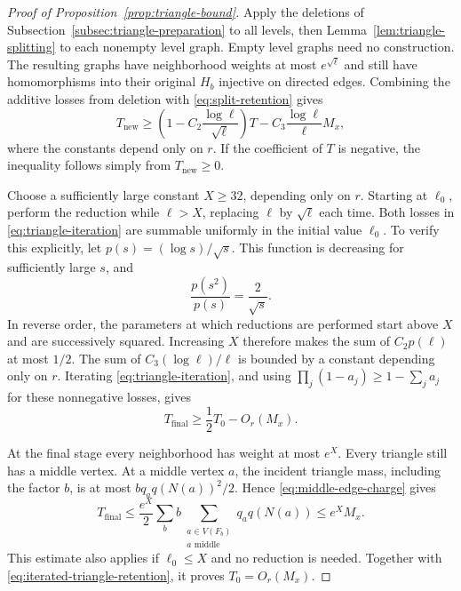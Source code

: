 \begin{proof}[Proof of Proposition~\ref{prop:triangle-bound}]
Apply the deletions of Subsection~\ref{subsec:triangle-preparation} to
all levels, then Lemma~\ref{lem:triangle-splitting} to each nonempty
level graph.  Empty level graphs need no construction.  The resulting
graphs have neighborhood weights at most $e^{\sqrt\ell}$ and still
have homomorphisms into their original $H_b$ injective on directed
edges.  Combining the additive losses from deletion with
\eqref{eq:split-retention} gives
\begin{equation}
 T_{\mathrm{new}}\ge
 \left(1-C_2\frac{\log\ell}{\sqrt\ell}\right)T
       -C_3\frac{\log\ell}{\ell}M_x,
 \label{eq:triangle-iteration}
\end{equation}
where the constants depend only on $r$.  If the coefficient of $T$ is
negative, the inequality follows simply from $T_{\mathrm{new}}\ge0$.

Choose a sufficiently large constant $X\ge32$, depending only on $r$.
Starting at $\ell_0$, perform the reduction while $\ell>X$, replacing
$\ell$ by $\sqrt\ell$ each time.  Both losses in
\eqref{eq:triangle-iteration} are summable uniformly in the initial
value $\ell_0$.  To verify this explicitly, let
$p(s)=(\log s)/\sqrt s$.  This function is decreasing for sufficiently
large $s$, and
\[
 \frac{p(s^2)}{p(s)}=\frac2{\sqrt s}.
\]
In reverse order, the parameters at which reductions are performed
start above $X$ and are successively squared.  Increasing $X$ therefore
makes the sum of $C_2p(\ell)$ at most $1/2$.  The sum of
$C_3(\log\ell)/\ell$ is bounded by a constant depending only on $r$.
Iterating \eqref{eq:triangle-iteration}, and using
$\prod_j(1-a_j)\ge1-\sum_ja_j$ for these nonnegative losses, gives
\begin{equation}
 T_{\mathrm{final}}\ge\frac12T_0-O_r(M_x).
 \label{eq:iterated-triangle-retention}
\end{equation}

At the final stage every neighborhood has weight at most $e^X$.
Every triangle still has a middle vertex.  At a middle vertex $a$,
the incident triangle mass, including the factor $b$, is at most
$bq_aq(N(a))^2/2$.  Hence \eqref{eq:middle-edge-charge} gives
\[
 T_{\mathrm{final}}
 \le\frac{e^X}{2}
      \sum_b b\sum_{\substack{a\in V(F_b)\\a\text{ middle}}}
                     q_aq(N(a))
 \le e^XM_x.
\]
This estimate also applies if $\ell_0\le X$ and no reduction is needed.
Together with \eqref{eq:iterated-triangle-retention}, it proves
$T_0=O_r(M_x)$.
\end{proof}

